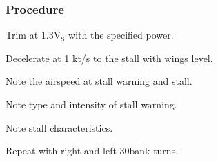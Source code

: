 % 
% 
%
 \subsubsection*{Procedure}
 \begin{compactenum}
   \item Trim at $\mathrm{1.3V_{S}}$ with the specified power.
   \item Decelerate at 1 kt/s to the stall with wings level.
   \item Note the airspeed at stall warning and stall.
   \item Note type and intensity of stall warning.
   \item Note stall characteristics.
   \item Repeat with right and left 30\textdegree bank turns.
   \end{compactenum}